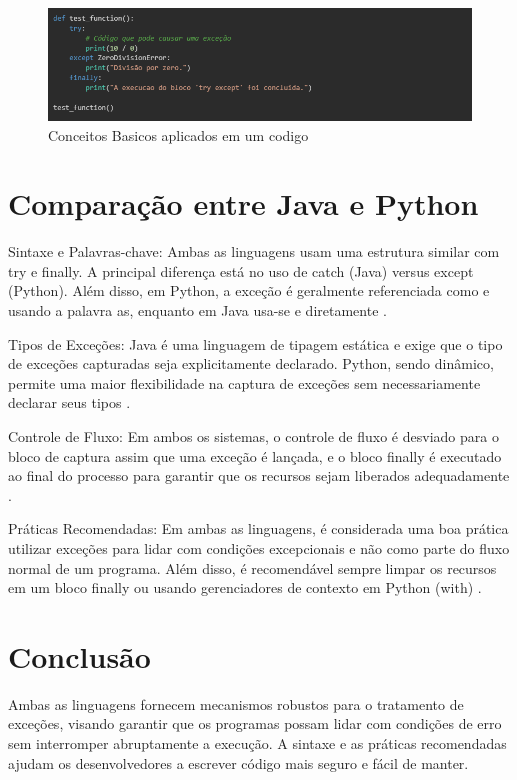 \documentclass[12pt,a4paper]{article}
\begin{document}
\begin{figure}[h]
    \centering
    \includegraphics[width=\textwidth]{python2.png}
    \caption{Conceitos Basicos aplicados em um codigo}
    \label{fig:imagem4}
\end{figure}

\section{Comparação entre Java e Python}
Sintaxe e Palavras-chave: Ambas as linguagens usam uma estrutura similar com try e finally. A principal diferença está no uso de catch (Java) versus except (Python). Além disso, em Python, a exceção é geralmente referenciada como e usando a palavra as, enquanto em Java usa-se e diretamente \cite{java_tut, python_doc}.

Tipos de Exceções: Java é uma linguagem de tipagem estática e exige que o tipo de exceções capturadas seja explicitamente declarado. Python, sendo dinâmico, permite uma maior flexibilidade na captura de exceções sem necessariamente declarar seus tipos \cite{java_tut, python_doc}.

Controle de Fluxo: Em ambos os sistemas, o controle de fluxo é desviado para o bloco de captura assim que uma exceção é lançada, e o bloco finally é executado ao final do processo para garantir que os recursos sejam liberados adequadamente \cite{java_doc, python_doc}.

Práticas Recomendadas: Em ambas as linguagens, é considerada uma boa prática utilizar exceções para lidar com condições excepcionais e não como parte do fluxo normal de um programa. Além disso, é recomendável sempre limpar os recursos em um bloco finally ou usando gerenciadores de contexto em Python (with) \cite{java_practices, python_practices}.

\section{Conclusão}
Ambas as linguagens fornecem mecanismos robustos para o tratamento de exceções, visando garantir que os programas possam lidar com condições de erro sem interromper abruptamente a execução. A sintaxe e as práticas recomendadas ajudam os desenvolvedores a escrever código mais seguro e fácil de manter.
\end{document}
